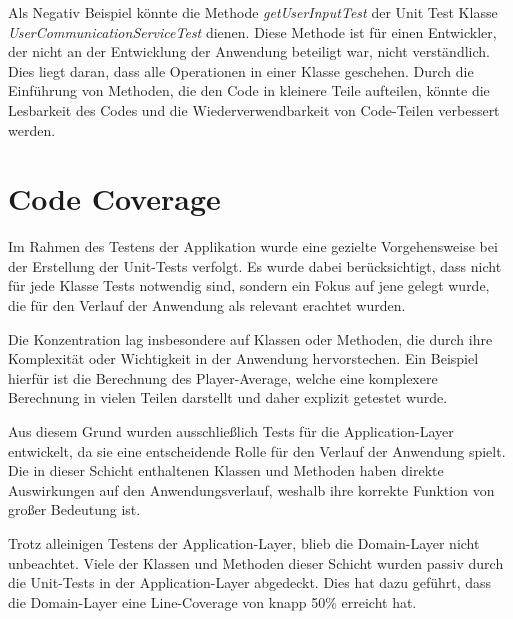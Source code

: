 Als Negativ Beispiel könnte die Methode \textit{getUserInputTest} der Unit Test Klasse \textit{UserCommunicationServiceTest} dienen. Diese Methode ist für einen Entwickler, der nicht an der Entwicklung der Anwendung beteiligt war, nicht verständlich. Dies liegt daran, dass alle Operationen in einer Klasse geschehen. Durch die Einführung von Methoden, die den Code in kleinere Teile aufteilen, könnte die Lesbarkeit des Codes und die Wiederverwendbarkeit von Code-Teilen verbessert werden.\\
\section{Code Coverage}
Im Rahmen des Testens der Applikation wurde eine gezielte Vorgehensweise bei der Erstellung der Unit-Tests verfolgt. Es wurde dabei berücksichtigt, dass nicht für jede Klasse Tests notwendig sind, sondern ein Fokus auf jene gelegt wurde, die für den Verlauf der Anwendung als relevant erachtet wurden.

Die Konzentration lag insbesondere auf Klassen oder Methoden, die durch ihre Komplexität oder Wichtigkeit in der Anwendung hervorstechen. Ein Beispiel hierfür ist die Berechnung des Player-Average, welche eine komplexere Berechnung in vielen Teilen darstellt und daher explizit getestet wurde.

Aus diesem Grund wurden ausschließlich Tests für die Application-Layer entwickelt, da sie eine entscheidende Rolle für den Verlauf der Anwendung spielt. Die in dieser Schicht enthaltenen Klassen und Methoden haben direkte Auswirkungen auf den Anwendungsverlauf, weshalb ihre korrekte Funktion von großer Bedeutung ist.

Trotz alleinigen Testens der Application-Layer, blieb die Domain-Layer nicht unbeachtet. Viele der Klassen und Methoden dieser Schicht wurden passiv durch die Unit-Tests in der Application-Layer abgedeckt. Dies hat dazu geführt, dass die Domain-Layer eine Line-Coverage von knapp 50\% erreicht hat.

